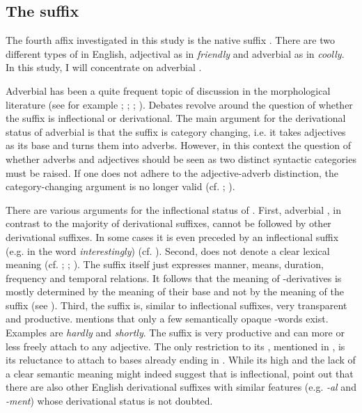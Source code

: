 \subsection{The suffix }\label{ly}

The fourth affix investigated in this study is the native suffix . There are two different types of  in English, adjectival  as in \textit{friendly} and adverbial  as in \textit{coolly}. In this study, I will concentrate on adverbial .

Adverbial  has been a quite frequent topic of discussion in the morphological literature (see for example \citealt{Zwicky.1995}; \citealt{Plag.2003}; \citealt{Giegerich.2012}; \citealt{Bauer.2013}). Debates revolve around the question of whether the suffix is inflectional or derivational. 
The main argument for the derivational status of adverbial  is that the suffix is category changing, i.e. it takes adjectives as its base and turns them into adverbs. However, in this context the question of whether adverbs and adjectives should be seen as two distinct syntactic categories must be raised. If one does not adhere to the adjective-adverb distinction, the category-changing argument is no longer valid (cf. \citealt[195]{Plag.2003}; \citealt{Giegerich.2012}).
	
There are various arguments for the inflectional status of . First, adverbial , in contrast to the majority of derivational suffixes, cannot be followed by other derivational suffixes. In some cases it is even preceded by an inflectional suffix (e.g. in the word \textit{interestingly}) (cf. \citealt{Giegerich.2012}).
Second,  does not denote a clear lexical meaning (cf. \citealt[195]{Plag.2003}; \citealt{Giegerich.2012}; \citealt[324]{Bauer.2013}). The suffix itself just expresses manner, means, duration, {frequency} and temporal relations. It follows that the meaning of -derivatives is mostly determined by the meaning of their base and not by the meaning of the suffix (see \citealt[326f.]{Bauer.2013}). 
Third, the suffix  is, similar to inflectional suffixes, very transparent and productive. \citet[196]{Plag.2003} mentions that only a few semantically opaque -words exist. Examples are \textit{hardly} and \textit{shortly}. 
The suffix is very productive and can more or less freely attach to any adjective. The only restriction to its , mentioned in \citet[334]{Bauer.2013}, is its reluctance to attach to bases already ending in .
While its high  and the lack of a clear semantic meaning might indeed suggest that  is inflectional, \citet[324]{Bauer.2013} point out that there are also other English derivational suffixes with similar features (e.g. \textit{-al} and \textit{-ment}) whose derivational status is not doubted. 
 
